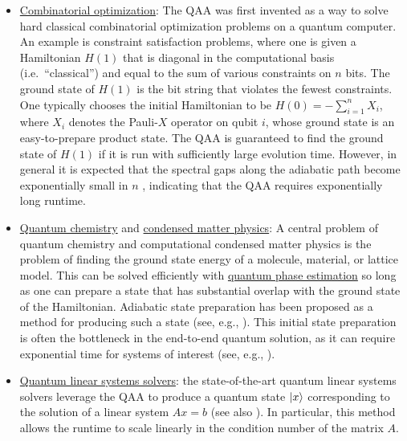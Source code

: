 \begin{refsection}
\begin{itemize}
    \item \hyperref[appl:CombOpt]{Combinatorial optimization}: The QAA was first invented \cite{farhi2000QCompAdiabatic} as a way to solve hard classical combinatorial optimization problems on a quantum computer. An example is constraint satisfaction problems, where one is given a Hamiltonian $H(1)$ that is diagonal in the computational basis (i.e.~``classical'') and equal to the sum of various constraints on $n$ bits. The ground state of $H(1)$ is the bit string that violates the fewest constraints. One typically chooses the initial Hamiltonian to be $H(0) = -\sum_{i=1}^n X_i$, where $X_i$ denotes the Pauli-$X$ operator on qubit $i$, whose ground state is an easy-to-prepare product state. The QAA is guaranteed to find the ground state of $H(1)$ if it is run with sufficiently large evolution time. However, in general it is expected that the spectral gaps along the adiabatic path become exponentially small in $n$ \cite{knysh2010relevance, young2010firstOrderAdiabatic, hen2011exponentialAdiabatic,altshuler2010AndersonLocalization, wecker2016trainingQuantumOptimizer}, indicating that the QAA requires exponentially long runtime. 
    \item \hyperref[appl:QuantumChemistry]{Quantum chemistry} and \hyperref[appl:CondensedMatter]{condensed matter physics}: A central problem of quantum chemistry and computational condensed matter physics is the problem of finding the ground state energy of a molecule, material, or lattice model. This can be solved efficiently with \hyperref[prim:QPE]{quantum phase estimation} so long as one can prepare a state that has substantial overlap with the ground state of the Hamiltonian.  Adiabatic state preparation has been proposed as a method for producing such a state (see, e.g., \cite{wu2002pairingModels,reiher2017ElucidatingReactionMechanisms,veis2014AdiabaticStatePrepMethylene,kremenetski2021AdiabaticMolecular,Sugisaki2022AdiabaticMolecular,wecker2015StronglyCorrelated,yu2022geometricAdiabaticChemistry}). This initial state preparation is often the bottleneck in the end-to-end quantum solution, as it can require exponential time for systems of interest (see, e.g., \cite{lee2022isThereEvidenceChemistry}).  
    \item \hyperref[prim:QuantumLinearSystemSolvers]{Quantum linear systems solvers}: the state-of-the-art quantum linear systems solvers \cite{costa2021OptimalLinearSystem} leverage the QAA to produce a quantum state $\lvert x\rangle$ corresponding to the solution of a linear system $Ax = b$ (see also \cite{subasi2019QAlgSysLinEqsAdiabatic,an2022QLSStimeDepAdiabatic,lin2019OptimalQEigenstateFiltering,jennings2023QLSS}). In particular, this method allows the runtime to scale linearly in the condition number of the matrix $A$. 
\end{itemize}



\end{refsection}
